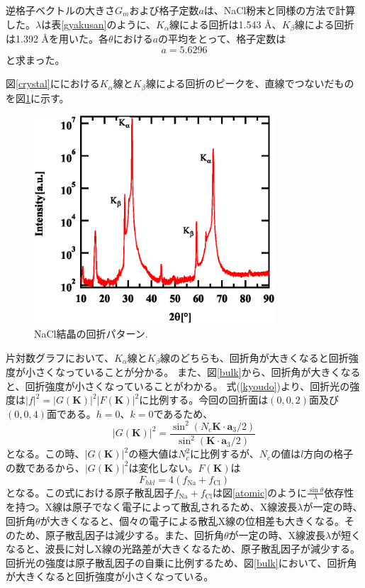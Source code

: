 \documentclass[11pt,a4j,uplatex]{jsarticle}
\begin{document}
逆格子ベクトルの大きさ$G_m$および格子定数$a$は、NaCl粉末と同様の方法で計算した。$\lambda$は表\ref{gyakusan}のように、$K_\alpha$線による回折は1.543 \AA 、$K_\beta$線による回折は1.392 \AA を用いた。各$\theta$における$a$の平均をとって、格子定数は
\begin{equation}
 \nonumber
 a=5.6296
 \label{complete2}
\end{equation}
と求まった。

 図\ref{crystal}ににおける$K_\alpha$線と$K_\beta$線による回折のピークを、直線でつないだものを図\ref{kakb}に示す。

 \begin{figure}[htb]
  \centering
  \includegraphics[clip,width=9cm]{kakb.eps}
  \caption{NaCl結晶の回折パターン.}
  \label{kakb}
 \end{figure}

 片対数グラフにおいて、$K_\alpha$線と$K_\beta$線のどちらも、回折角が大きくなると回折強度が小さくなっていることが分かる。
\fi
また、図\ref{bulk}から、回折角が大きくなると、回折強度が小さくなっていることがわかる。
式(\ref{kyoudo})より、回折光の強度は${|f|}^2={|G\bm{(K)}|^2}{|F\bm{(K)}|^2}$に比例する。今回の回折面は$(0,0,2)$面及び$(0,0,4)$面である。$h=0、k=0$であるため、
\begin{equation}
 |G(\bm{K})|^2=\frac{\sin^2(N_c\bm{K}\cdot\bm{a}_3/2)}{\sin^2(\bm{K}\cdot\bm{a}_3/2)}
\end{equation}
となる。この時、$|G(\bm{K})|^2$の極大値は$N_c^2$に比例するが、$N_c$の値は$l$方向の格子の数であるから、$|G(\bm{K})|^2$は変化しない。$F(\bm{K})$は
\begin{equation}
 F_{hkl}=4(f_{\mathrm{Na}}+f_{\mathrm{Cl}})
\end{equation}
となる。この式における原子散乱因子$f_{\mathrm{Na}}+f_{\mathrm{Cl}}$は図\ref{atomic}のように$\frac{\sin\theta}{\lambda}$依存性を持つ\cite{atom}。X線は原子でなく電子によって散乱されるため、X線波長$\lambda$が一定の時、回折角$\theta$が大きくなると、個々の電子による散乱X線の位相差も大きくなる。そのため、原子散乱因子は減少する。また、回折角$\theta$が一定の時、X線波長$\lambda$が短くなると、波長に対しX線の光路差が大きくなるため、原子散乱因子が減少する。回折光の強度は原子散乱因子の自乗に比例するため、図\ref{bulk}において、回折角が大きくなると回折強度が小さくなっている。
\end{document}
